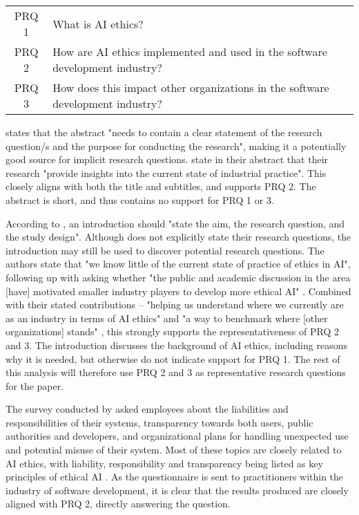 \begin{table}[h]
    \centering
    \begin{tabular}{cl}
        PRQ 1 & What is AI ethics? \\
        PRQ 2 & How are AI ethics implemented and used in the software development industry? \\
        PRQ 3 & How does this impact other organizations in the software development industry? \\
    \end{tabular}
\end{table}

\textcite[p.115]{Cuschieri_2019} states that the abstract "needs to contain a clear statement of the research question/s and the purpose for conducting the research", making it a potentially good source for implicit research questions. \textcite[p.50]{Vakkuri_2020} state in their abstract that their research "provide insights into the current state of industrial practice". This closely aligns with both the title and subtitles, and supports PRQ 2. The abstract is short, and thus contains no support for PRQ 1 or 3.

According to \textcite[p.2]{Jha_2014}, an introduction should "state the aim, the research question, and the study design". Although \textcite{Vakkuri_2020} does not explicitly state their research questions, the introduction may still be used to discover potential research questions. The authors state that "we know little of the current state of practice of ethics in AI", following up with asking whether "the public and academic discussion in the area [have] motivated smaller industry players to develop more ethical AI" \parencite[p.50]{Vakkuri_2020}. Combined with their stated contributions -- "helping us understand where we currently are as an industry in terms of AI ethics" and "a way to benchmark where [other organizations] stands" \parencite[p.51]{Vakkuri_2020}, this strongly supports the representativeness of PRQ 2 and 3. The introduction discusses the background of AI ethics, including reasons why it is needed, but otherwise do not indicate support for PRQ 1. The rest of this analysis will therefore use PRQ 2 and 3 as representative research questions for the paper.



The survey conducted by \textcite{Vakkuri_2020} asked employees about the liabilities and responsibilities of their systems, transparency towards both users, public authorities and developers, and organizational plans for handling unexpected use and potential misuse of their system. Most of these topics are closely related to AI ethics, with liability, responsibility and transparency being listed as key principles of ethical AI \parencite[p.51]{Vakkuri_2020}. As the questionnaire is sent to practitioners within the industry of software development, it is clear that the results produced are closely aligned with PRQ 2, directly answering the question.

